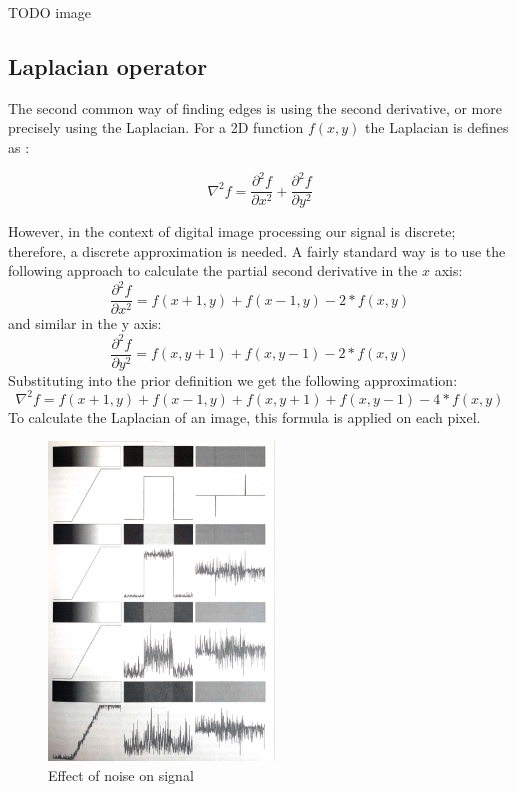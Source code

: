 \documentclass[
  digital,     %
  oneside,     %
  nosansbold,  %
  nocolorbold, %
  lof,         %
  lot,         %
]{fithesis4}
\begin{document}
TODO image

\subsection{Laplacian operator}

The second common way of finding edges is using the second derivative, or more
precisely using the Laplacian. For a 2D function $f(x, y)$ the Laplacian is
defines as \parencite{gonzalez2002}:

$$\nabla^2 f = \frac{\partial^2 f}{\partial x^2} + \frac{\partial^2 f}{\partial y^2}$$

However, in the context of digital image processing our signal is discrete;
therefore, a discrete approximation is needed. A fairly standard way is to use
the following approach to calculate the partial second derivative in the $x$
axis:
$$\frac{\partial^2 f}{\partial x^2} = f(x + 1, y) + f(x - 1, y) - 2*f(x, y)$$
and similar in the y axis:
$$\frac{\partial^2 f}{\partial y^2} = f(x, y + 1) + f(x, y - 1) - 2*f(x, y)$$
Substituting into the prior definition we get the following approximation:
$$\nabla^2 f = f(x+1, y) + f(x-1, y) + f(x, y+1) + f(x, y-1) - 4*f(x,y)$$
To calculate the Laplacian of an image, this formula is applied on each pixel.


\begin{figure}
    \begin{center}
        \includegraphics[width=6cm]{"resources/gonzalez_edges_and_noise.jpg"}
    \end{center}
    \caption{Effect of noise on signal \parencite{gonzalez2002}}
    \label{fig:edges_noise}
\end{figure}
\end{document}

